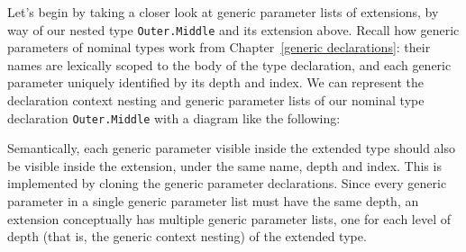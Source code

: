 \documentclass[../generics]{subfiles}
\begin{document}
Let's begin by taking a closer look at generic parameter lists of extensions, by way of our nested type \texttt{Outer.Middle} and its extension above. Recall how generic parameters of nominal types work from Chapter~\ref{generic declarations}: their names are lexically scoped to the body of the type declaration, and each generic parameter uniquely identified by its depth and index. We can represent the declaration context nesting and generic parameter lists of our nominal type declaration \texttt{Outer.Middle} with a diagram like the following:
\begin{quote}
\end{quote}

Semantically, each generic parameter visible inside the extended type should also be visible inside the extension, under the same name, depth and index. This is implemented by cloning the generic parameter declarations. Since every generic parameter in a single generic parameter list must have the same depth, an extension conceptually has multiple generic parameter lists, one for each level of depth (that is, the generic context nesting) of the extended type.
\end{document}
